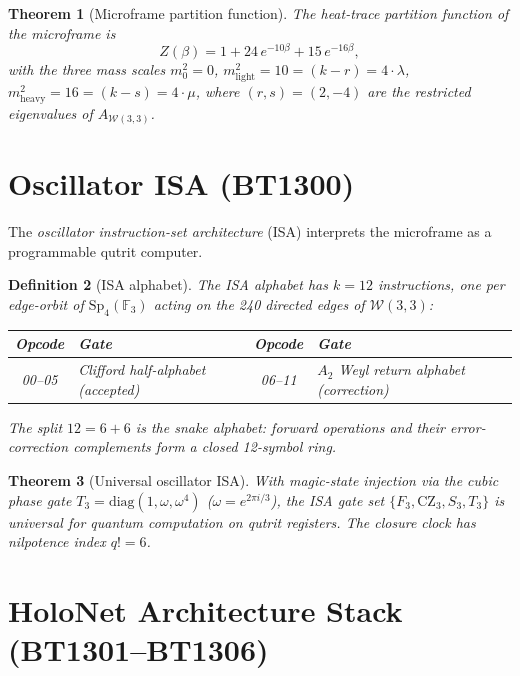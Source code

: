 \documentclass[12pt,a4paper]{article}
\newtheorem{theorem}{Theorem}[section]
\newtheorem{definition}[theorem]{Definition}
\newcommand{\W}{\mathcal{W}(3,3)}
\newcommand{\Sp}{\mathrm{Sp}_4(\mathbb{F}_3)}
\begin{document}
\begin{theorem}[Microframe partition function]
  The heat-trace partition function of the microframe is
  \[
    Z(\beta) = 1 + 24\,e^{-10\beta} + 15\,e^{-16\beta},
  \]
  with the three mass scales
  $m_0^2=0$, $m_\mathrm{light}^2=10=(k-r)=4\cdot\lambda$,
  $m_\mathrm{heavy}^2=16=(k-s)=4\cdot\mu$,
  where $(r,s)=(2,-4)$ are the restricted eigenvalues of $A_{\W}$.
\end{theorem}

\section{Oscillator ISA (BT1300)}

The \emph{oscillator instruction-set architecture} (ISA) interprets
the microframe as a programmable qutrit computer.

\begin{definition}[ISA alphabet]
  The ISA alphabet has $k=12$ instructions, one per edge-orbit of
  $\Sp$ acting on the 240 directed edges of $\W$:
  \begin{center}
  \begin{tabular}{clcl}
  \toprule
  Opcode & Gate & Opcode & Gate\\
  \midrule
  00--05 & Clifford half-alphabet (accepted) &
  06--11 & $A_2$ Weyl return alphabet (correction)\\
  \bottomrule
  \end{tabular}
  \end{center}
  The split $12 = 6+6$ is the \emph{snake alphabet}: forward operations
  and their error-correction complements form a closed 12-symbol ring.
\end{definition}

\begin{theorem}[Universal oscillator ISA]
  With magic-state injection via the cubic phase gate $T_3=\mathrm{diag}(1,\omega,\omega^4)$
  ($\omega=e^{2\pi i/3}$), the ISA gate set
  $\{F_3, \mathrm{CZ}_3, S_3, T_3\}$
  is universal for quantum computation on qutrit registers.
  The closure clock has nilpotence index $q!=6$.
\end{theorem}

\section{HoloNet Architecture Stack (BT1301--BT1306)}
\end{document}
